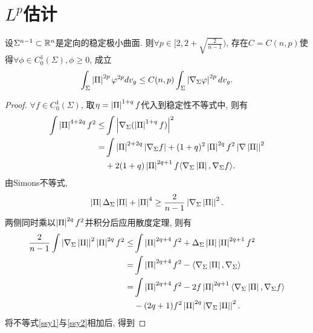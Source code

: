 \section{$L^p$估计}
\begin{theorem} \label{ssy}
    设$\Sigma^{n-1}\subset \mathbb{R}^n$是定向的稳定极小曲面. 则$\forall p \in [2, 2+\sqrt{\frac{2}{n-1}})$, 存在$C=C(n,p)$使得$\forall \phi \in C^1_0(\Sigma), \phi \ge 0$, 成立 
    \begin{equation}
        \int_\Sigma \left | {\Pi} \right |^{2p}\varphi^{2p}dv_g \le C(n,p) \int_\Sigma \left | \nabla_\Sigma \varphi \right |^{2p}dv_g.
    \end{equation}
\end{theorem}
\begin{proof}
    $\forall f \in C^1_0(\Sigma)$, 取$\eta=\left | {\Pi} \right |^{1+q}f$代入到稳定性不等式中, 则有
    \begin{equation} \label{ssy1}
        \begin{split}
            \int \left | {\Pi} \right |^{4+2q}f^2  \le& \int \left | \nabla_\Sigma (\left | {\Pi} \right |^{1+q}f) \right |^2 \\
            =& \int \left | {\Pi} \right |^{2+2q} \left | \nabla_\Sigma f \right | + (1+q)^2 \left | {\Pi} \right |^{2q}f^2 \left | \nabla \left | {\Pi} \right | \right |^2  \\
            &+ 2(1+q)\left | {\Pi} \right |^{2q+1}f{\left < \nabla_\Sigma \left | {\Pi} \right |, \nabla_\Sigma f \right >}.
        \end{split}
    \end{equation}
    由Simons不等式,
    \begin{equation}
        \left | {\Pi} \right |\Delta_\Sigma\left | {\Pi} \right | + \left | {\Pi} \right |^4 \ge \frac{2}{n-1}\left | \nabla_\Sigma \left | {\Pi} \right | \right |^2.
    \end{equation}
    两侧同时乘以$\left | {\Pi} \right |^{2q}f^2$并积分后应用散度定理, 则有
    \begin{equation} \label{ssy2}
        \begin{split}
            \frac{2}{n-1}\int \left | \nabla_\Sigma \left | {\Pi} \right | \right |^2 \left | {\Pi} \right |^{2q}f^2 \le&  \int \left | {\Pi} \right |^{2q+4}f^2 + \Delta_\Sigma \left | {\Pi} \right | \left | {\Pi} \right |^{2q+1}f^2 \\
            =&\int \left | {\Pi} \right |^{2q+4}f^2-{\left < \nabla_\Sigma \left | {\Pi} \right |, \nabla_\Sigma \right >}\\
            =&\int \left | {\Pi} \right |^{2q+4}f^2-2f\left | {\Pi} \right |^{2q+1}{\left < \nabla_\Sigma \left | {\Pi} \right |, \nabla_\Sigma f \right >}\\
            &-(2q+1)f^2\left | {\Pi} \right |^{2q} \left | \nabla_\Sigma\left | {\Pi} \right | \right |^2.
        \end{split}
    \end{equation}
    将不等式\eqref{ssy1}与\eqref{ssy2}相加后, 得到

\end{proof}
